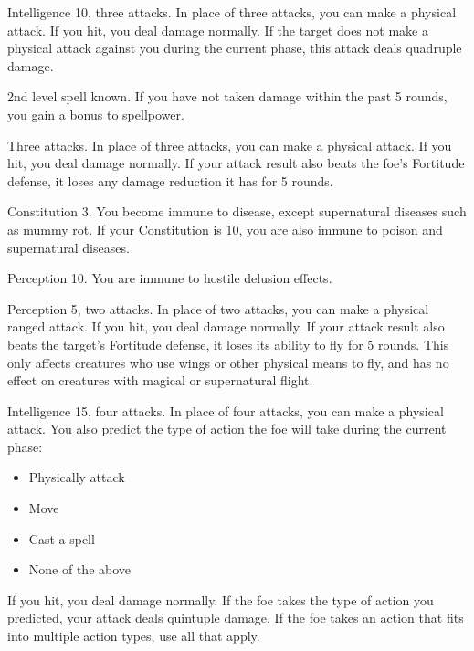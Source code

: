 \featpre Intelligence 10, three attacks.
\featben In place of three attacks, you can make a physical attack.
If you hit, you deal damage normally.
If the target does not make a physical attack against you during the current phase, this attack deals quadruple damage.

\featpre 2nd level spell known.
\featben If you have not taken damage within the past 5 rounds, you gain a  bonus to spellpower.

\featpre Three attacks.
\featben In place of three attacks, you can make a physical attack.
If you hit, you deal damage normally.
If your attack result also beats the foe's Fortitude defense, it loses any damage reduction it has for 5 rounds.

\featpre Constitution 3.
\featben You become immune to disease, except supernatural diseases such as mummy rot.
If your Constitution is 10, you are also immune to poison and supernatural diseases.

\featpre Perception 10.
\featben You are immune to hostile delusion effects.

\featpre Perception 5, two attacks.
\featben In place of two attacks, you can make a physical ranged attack.
If you hit, you deal damage normally.
If your attack result also beats the target's Fortitude defense, it loses its ability to fly for 5 rounds.
This only affects creatures who use wings or other physical means to fly, and has no effect on creatures with magical or supernatural flight.

\featpre Intelligence 15, four attacks.
\featben In place of four attacks, you can make a physical attack.
You also predict the type of action the foe will take during the current phase:
\begin{itemize}
    \item Physically attack
    \item Move
    \item Cast a spell
    \item None of the above
\end{itemize}
If you hit, you deal damage normally.
If the foe takes the type of action you predicted, your attack deals quintuple damage.
If the foe takes an action that fits into multiple action types, use all that apply.


